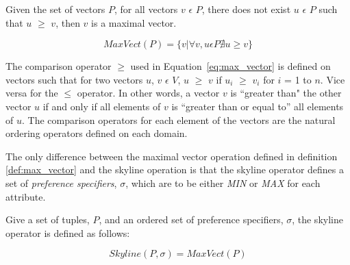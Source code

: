 \documentclass{sig-alternate}
\newenvironment{definition}[1][Definition]{\begin{trivlist}
\item[\hskip \labelsep {\bfseries #1}]}{\end{trivlist}}
\begin{document}

\begin{definition}[Maximal Vector]\label{def:max_vector}
Given the set of vectors $P$, for all vectors $v$ $\epsilon$ $P$,
there does not exist $u$ $\epsilon$ $P$ such that $u$ $\geq$ $v$,
then $v$ is a maximal vector.

\begin{equation}\label{eq:max_vector}
    MaxVect(P) = \{v | \forall v, u \epsilon P \nexists u \geq v\}
\end{equation}

\end{definition}

The comparison operator $\geq$ used in Equation~\ref{eq:max_vector} is
defined on vectors such that for two vectors $u$, $v$ $\epsilon$ $V$,
$u$ $\geq$ $v$ if $u_i$ $\geq$ $v_i$ for $i$ = 1 to $n$. Vice versa for
the $\leq$ operator. In other words, a vector $v$ is ``greater than" the
other vector $u$ if and only if all elements of $v$ is ``greater than or equal to''
all elements of $u$. The comparison operators for each element of the
vectors are the natural ordering operators defined on each domain.

The only difference between the maximal vector operation defined in
definition \ref{def:max_vector} and the skyline operation is that the
skyline operator defines a set of \emph{preference specifiers}, $\sigma$,
which are to be either \emph{MIN} or \emph{MAX} for each attribute.



\begin{definition}[Skyline Operator]\label{def:skyline}
Give a set of tuples, $P$, and an ordered set of preference specifiers,
$\sigma$, the skyline operator is defined as follows:

\begin{equation}\label{eq:skyline}
    Skyline(P, \sigma) = MaxVect(P)
\end{equation}

\end{definition}
\end{document}
